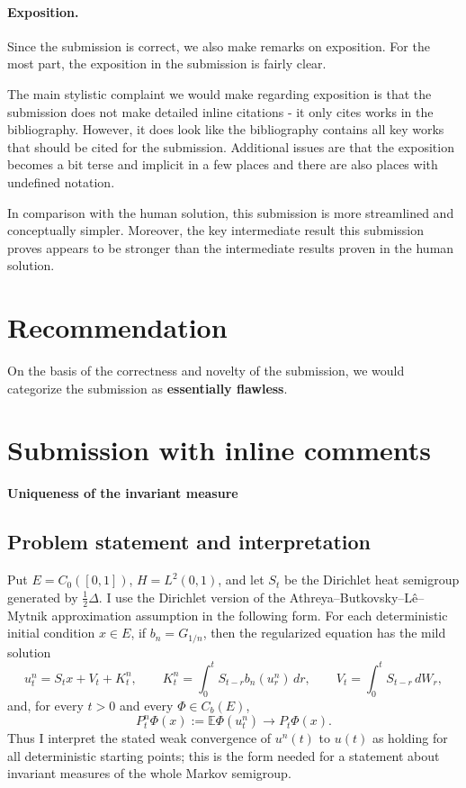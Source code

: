 \documentclass[12pt]{article}
\newcommand{\E}{\mathbb E}
\newcommand{\1}{\mathbf 1}
\begin{document}
\paragraph{Exposition.}
Since the submission is correct, we also make remarks on exposition.
For the most part, the exposition in the submission is fairly clear. 

The main stylistic complaint we would make regarding exposition is that the submission does not make detailed inline citations - it only cites works in the bibliography. 
However, it does look like the bibliography contains all key works that should be cited for the submission.
Additional issues are that the exposition becomes a bit terse and implicit in a few places and there are also places with undefined notation.

In comparison with the human solution, this submission is more streamlined and conceptually simpler. 
Moreover, the key intermediate result this submission proves appears to be stronger than the intermediate results proven in the human solution. 

\section{Recommendation}
On the basis of the correctness and novelty of the submission, we would categorize the submission as \textbf{essentially flawless}. 


  \section{Submission with inline comments}

\date{}


\begin{center}
{\bf Uniqueness of the invariant measure}
\end{center}

\subsection*{Problem statement and interpretation}

Put \(E=C_0([0,1])\), \(H=L^2(0,1)\), and let \(S_t\) be the Dirichlet heat
semigroup generated by \(\frac12\Delta\).  I use the Dirichlet version of the
Athreya--Butkovsky--L\^e--Mytnik approximation assumption in the following
form.  For each deterministic initial condition \(x\in E\), if \(b_n=G_{1/n}\),
then the regularized equation has the mild solution
\[
  u_t^n=S_t x+V_t+K_t^n,\qquad
  K_t^n=\int_0^tS_{t-r}b_n(u_r^n)\,dr,\qquad
  V_t=\int_0^tS_{t-r}\,dW_r ,
\]
and, for every \(t>0\) and every \(\Phi\in C_b(E)\),
\[
        P_t^n\Phi(x):=\E\Phi(u_t^n)\longrightarrow P_t\Phi(x).
        \tag{1}
\]
Thus I interpret the stated weak convergence of \(u^n(t)\) to \(u(t)\) as
holding for all deterministic starting points; this is the form needed for a
statement about invariant measures of the whole Markov semigroup.
\end{document}
